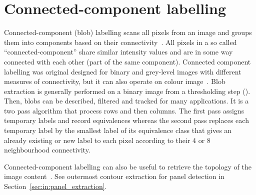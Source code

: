 
\section{Connected-component labelling} %
\label{sec:ap:connected_component_labelling}
Connected-component (blob) labelling scans all pixels from an image and groups them into components based on their connectivity~\cite{Szeliski2010Computer}.
All pixels in a so called ``connected-component'' share similar intensity values and are in some way connected with each other (part of the same component).
Connected component labelling was original designed for binary and grey-level images with different measures of connectivity, but it can also operate on colour image~\cite{dillencourt1992general}.
Blob extraction is generally performed on a binary image from a thresholding step ().
Then, blobs can be described, filtered and tracked for many applications.
It is a two pass algorithm that process rows and then columns.
The first pass assigns temporary labels and record equivalences whereas the second pass replaces each temporary label by the smallest label of its equivalence class that gives an already existing or new label to each pixel according to their 4 or 8 neighbourhood connectivity.

Connected-component labelling can also be useful to retrieve the topology of the image content~\cite{suzuki1985topological}.
See outermost contour extraction for panel detection in Section~\ref{sec:in:panel_extraction}.






